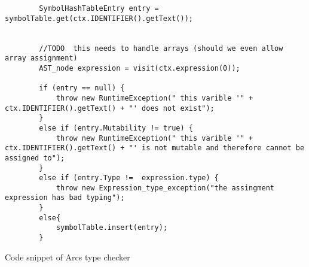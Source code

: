 \begin{listing}[htb!]
    \begin{verbatim}
        SymbolHashTableEntry entry = symbolTable.get(ctx.IDENTIFIER().getText());
        

        //TODO  this needs to handle arrays (should we even allow array assignment)
        AST_node expression = visit(ctx.expression(0));

        if (entry == null) {
            throw new RuntimeException(" this varible '" + ctx.IDENTIFIER().getText() + "' does not exist");
        }
        else if (entry.Mutability != true) {
            throw new RuntimeException(" this varible '" + ctx.IDENTIFIER().getText() + "' is not mutable and therefore cannot be assigned to");
        }
        else if (entry.Type !=  expression.type) {
            throw new Expression_type_exception("the assingment expression has bad typing");
        }
        else{
            symbolTable.insert(entry);
        }
    \end{verbatim}
    \caption{Code snippet of Arcs type checker}
    \label{lst:typecheckerexample}
\end{listing}

